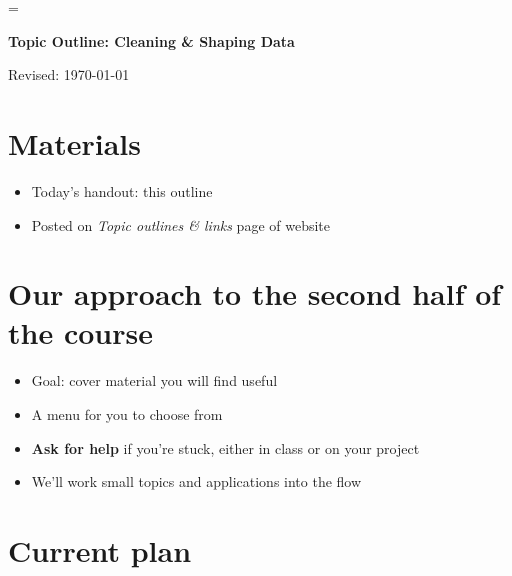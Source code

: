 \documentclass[11pt]{article}
\begin{document}
\parskip=\bigskipamount
\parindent=0.0in
\thispagestyle{empty}


\bigskip\bigskip
\centerline{\Large \bf Topic Outline:  Cleaning \& Shaping Data}
\centerline{Revised: \today}

\section*{Materials}

\begin{itemize}
\item  Today's handout:  this outline
\item  Posted on {\it Topic outlines \& links\/} page of website
\end{itemize}


\section*{Our approach to the second half of the course}

\begin{itemize}
\item Goal:  cover material you will find useful
\item A menu for you to choose from
\item {\bf Ask for help} if you're stuck, either in class or on your project
\item We'll work small topics and applications into the flow
\end{itemize}


\section*{Current plan}
\end{document}
